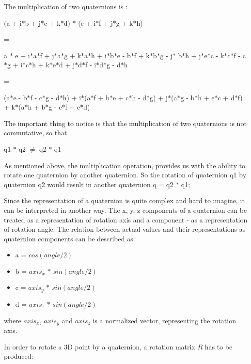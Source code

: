 \documentclass[times, 10pt,twocolumn]{article}
\begin{document}
The multiplication of two quaternions is :

\begin{center}
(a + i$\ast$b + j$\ast$c + k$\ast$d) $\ast$ (e + i$\ast$f + j$\ast$g + k$\ast$h)

=

a $\ast$ e + i$\ast$a$\ast$f  + j$\ast$a$\ast$g + k$\ast$a$\ast$h + i$\ast$b$\ast$e - b$\ast$f  + k$\ast$b$\ast$g - j$\ast$ b$\ast$h + j$\ast$e$\ast$c - k$\ast$c$\ast$f - c$\ast$g + i$\ast$c$\ast$h + k$\ast$e$\ast$d + j$\ast$d$\ast$f - i$\ast$d$\ast$g - d$\ast$h

=

(a$\ast$e - b$\ast$f - c$\ast$g - d$\ast$h)  + i$\ast$(a$\ast$f + b$\ast$e + c$\ast$h - d$\ast$g) + j$\ast$(a$\ast$g - b$\ast$h + e$\ast$c + d$\ast$f) + k$\ast$(a$\ast$h + b$\ast$g - c$\ast$f + e$\ast$d)
\end{center}

The important thing to notice is that the multiplication of two quaternions is not commutative, so that
\begin{center}
q1 $\ast$ q2 $\neq$ q2 $\ast$ q1
\end{center}

As mentioned above, the multiplication operation,  provides us with the ability to rotate one quaternion by another quaternion. So the rotation of quaternion q1 by quaternion q2 would result in another quaternion q = q2 $\ast$ q1;

Since the representation of a quaternion is quite complex and hard to imagine, it can be interpreted in another way. The x, y, z components of a quaternion can be treated as a representation of rotation axis and a component - as a representation of rotation angle. The relation between actual values and their representations as quaternion components can be described as:

\begin{itemize}
\item a = $cos(angle / 2)$
\item b =  $axis_x$ $\ast$ $sin(angle / 2)$
\item c = $axis_y$ $\ast$ $sin(angle / 2)$
\item d = $axis_z$ $\ast$ $sin(angle / 2)$
\end{itemize}
where $axis_x$, $axis_y$ and $axis_z$ is a normalized vector, representing the rotation axis.

In order to rotate a 3D point by a quaternion, a rotation matrix $R$ has to be produced:
\end{document}
